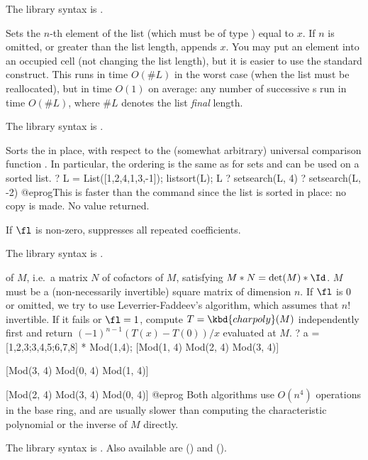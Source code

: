 The library syntax is .

\label{se:listput}
Sets the $n$-th element of the list
 (which must be of type ) equal to $x$. If $n$ is omitted,
or greater than the list length, appends $x$.
You may put an element into an occupied cell (not changing the
list length), but it is easier to use the standard 
construct. This runs in time $O(\#L)$ in the worst case (when the list must
be reallocated), but in time $O(1)$ on average: any number of successive
s run in time $O(\#L)$, where $\#L$ denotes the list
\emph{final} length.

The library syntax is .

\label{se:listsort}
Sorts the   in place, with respect to the (somewhat
arbitrary) universal comparison function . In particular, the
ordering is the same as for sets and  can be used on a sorted
list.
\bprog
? L = List([1,2,4,1,3,-1]); listsort(L); L
? setsearch(L, 4)
? setsearch(L, -2)
@eprog\noindent This is faster than the  command since the list
is sorted in place: no copy is made. No value returned.

If $\fl$ is non-zero, suppresses all repeated coefficients.

The library syntax is .

\label{se:matadjoint}
 of $M$, i.e.~a matrix $N$
of cofactors of $M$, satisfying $M*N=\det(M)*\Id$. $M$ must be a
(non-necessarily invertible) square matrix of dimension $n$.
If $\fl$ is 0 or omitted, we try to use Leverrier-Faddeev's algorithm,
which assumes that $n!$ invertible. If it fails or $\fl = 1$,
compute $T = \kbd{charpoly}(M)$ independently first and return
$(-1)^{n-1} (T(x)-T(0))/x$ evaluated at $M$.
\bprog
? a = [1,2,3;3,4,5;6,7,8] * Mod(1,4);
[Mod(1, 4) Mod(2, 4) Mod(3, 4)]

[Mod(3, 4) Mod(0, 4) Mod(1, 4)]

[Mod(2, 4) Mod(3, 4) Mod(0, 4)]
@eprog\noindent
Both algorithms use $O(n^4)$ operations in the base ring, and are usually
slower than computing the characteristic polynomial or the inverse of $M$
directly.

The library syntax is .
Also available are
 () and
 ().

